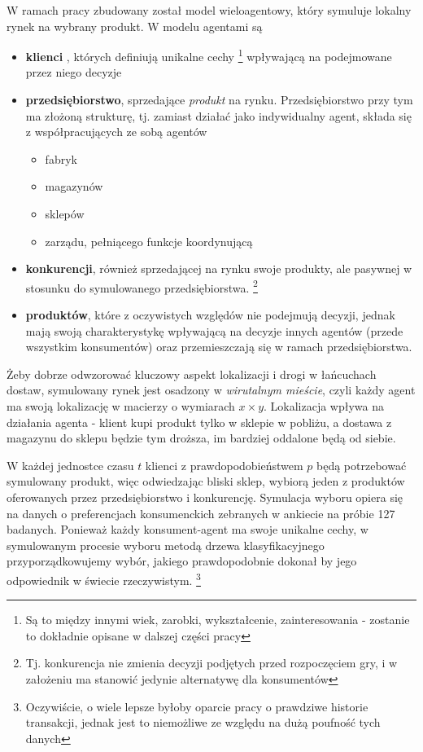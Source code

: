 \documentclass{article}
\begin{document}
W ramach pracy zbudowany został model wieloagentowy, który symuluje lokalny rynek na wybrany produkt. W modelu agentami są 
\begin{itemize} 
	\item \textbf{klienci} , których definiują unikalne cechy \footnote{Są to między innymi wiek, zarobki, wykształcenie, zainteresowania - zostanie to dokładnie opisane w dalszej części pracy}  wpływającą na podejmowane przez niego decyzje 
	\item \textbf{przedsiębiorstwo}, sprzedające \textit{produkt} na rynku. Przedsiębiorstwo przy tym ma złożoną strukturę, tj. zamiast działać jako indywidualny agent, składa się z współpracujących ze sobą agentów 
		\begin{itemize}
			\item fabryk
			\item magazynów
			\item sklepów 
			\item zarządu, pełniącego funkcje koordynującą 
		\end{itemize}
	\item \textbf{konkurencji}, również sprzedającej na rynku swoje produkty, ale pasywnej w stosunku do symulowanego przedsiębiorstwa. \footnote{Tj. konkurencja nie zmienia decyzji podjętych przed rozpoczęciem gry, i w założeniu ma stanowić jedynie alternatywę dla konsumentów} 
	\item \textbf{produktów}, które z oczywistych względów nie podejmują decyzji, jednak mają swoją charakterystykę wpływającą na decyzje innych agentów (przede wszystkim konsumentów) oraz przemieszczają się w ramach przedsiębiorstwa. 
\end{itemize}


Żeby dobrze odwzorować kluczowy aspekt lokalizacji i drogi w łańcuchach dostaw, symulowany rynek jest osadzony w \textit{wirutalnym mieście}, czyli każdy agent ma swoją lokalizację w macierzy o wymiarach $x \times y$. Lokalizacja wpływa na działania agenta - klient kupi produkt tylko w sklepie w pobliżu, a dostawa z magazynu do sklepu będzie tym droższa, im bardziej oddalone będą od siebie. 

W każdej jednostce czasu $ t $ klienci z prawdopodobieństwem $ p $ będą potrzebować symulowany produkt, więc odwiedzając bliski sklep, wybiorą jeden z produktów oferowanych przez przedsiębiorstwo i konkurencję. Symulacja wyboru opiera się na danych o preferencjach konsumenckich zebranych w ankiecie na próbie 127 badanych. Ponieważ każdy konsument-agent ma swoje unikalne cechy, w symulowanym procesie wyboru metodą drzewa klasyfikacyjnego przyporządkowujemy wybór, jakiego prawdopodobnie dokonał by jego odpowiednik w świecie rzeczywistym. \footnote{Oczywiście, o wiele lepsze byłoby oparcie pracy o prawdziwe historie transakcji, jednak jest to niemożliwe ze względu na dużą poufność tych danych}
\end{document}
